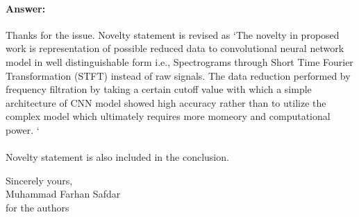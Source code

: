 \documentclass{article}
\begin{document}
\paragraph{Answer:}
Thanks for the issue. Novelty statement is revised as `The novelty in proposed work is representation of possible reduced data to convolutional neural network model in well distinguishable form i.e., Spectrograms through Short Time Fourier Transformation (STFT) instead of raw signals. The data reduction performed by frequency filtration by taking a certain cutoff value with which a simple architecture of CNN model showed high accuracy rather than to utilize the complex model which ultimately requires more momeory and computational power. `\\\\
Novelty statement is also included in the conclusion. 



\vspace{0.5cm}

Sincerely yours,\\
Muhammad Farhan Safdar\\
for the authors
\end{document}
